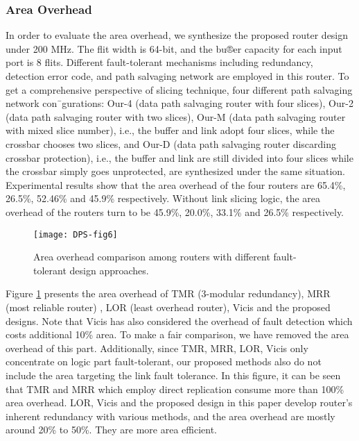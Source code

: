 \subsubsection{Area Overhead}
In order to evaluate the area overhead, we synthesize the proposed router design under 200 MHz. The flit width is 64-bit, and the bu®er capacity for each input port is 8 flits. Different fault-tolerant mechanisms including redundancy, detection error code, and path salvaging network are employed in this router. To get a comprehensive perspective of slicing technique, four different path salvaging network con¯gurations: Our-4 (data path salvaging router with four slices), Our-2 (data path salvaging router with two slices), Our-M (data path salvaging router with mixed slice number), i.e., the buffer and link adopt four slices, while the crossbar chooses two slices, and Our-D (data path salvaging router discarding crossbar protection), i.e., the buffer and link are still divided into four slices while the crossbar simply goes unprotected, are synthesized under the same situation. Experimental results show that the area overhead of the four routers are 65.4\%,
26.5\%, 52.46\% and 45.9\% respectively. Without link slicing logic, the area overhead of the routers turn to be 45.9\%, 20.0\%, 33.1\% and 26.5\% respectively.

\begin{figure}[h]
      \centering
        \texttt{[image: DPS-fig6]}
        \caption{Area overhead comparison among routers with different fault-tolerant design approaches.}
        \label{fig:dps-fig6}
\end{figure}

Figure \ref{fig:dps-fig6} presents the area overhead of TMR (3-modular redundancy), MRR (most reliable router) \cite{constantinides2006bulletproof}, LOR (least overhead router)\cite{constantinides2006bulletproof}, Vicis\cite{fick2009highly} and the proposed designs. Note that Vicis has also considered the overhead of fault detection which costs additional 10\% area. To make a fair comparison, we have removed the area overhead of this part. Additionally, since TMR, MRR, LOR, Vicis only concentrate on logic part fault-tolerant, our proposed methods also do not include the area targeting the link fault tolerance. In this figure, it can be seen that TMR and MRR which employ direct replication consume more than 100\% area overhead. LOR, Vicis and the proposed design in this paper develop router's inherent redundancy with various methods, and the area overhead are mostly around 20\% to 50\%. They are more area efficient.

